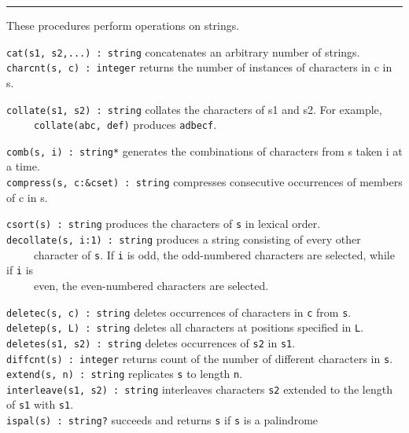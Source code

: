 \vspace{0.25cm}\hrule{}

These procedures perform operations on strings. 

\texttt{cat(s1, s2,...) : string} concatenates an arbitrary number of
strings.\\
\texttt{charcnt(s, c) : integer} returns the number of instances of
characters in c in s.

\texttt{collate(s1, s2) : string} collates the characters
of s1 and s2. For example,\\
 \ \ \ \ \ \texttt{collate({\textquotedbl}abc{\textquotedbl},
{\textquotedbl}def{\textquotedbl})} produces
\texttt{{\textquotedbl}adbecf{\textquotedbl}}.

\texttt{comb(s, i) : string*} generates the combinations of characters from s taken i at a time.\\
\texttt{compress(s, c:\&cset) : string} compresses consecutive
occurrences of members of c in s.

\texttt{csort(s) : string} produces the characters of \texttt{s} in
lexical order.\\
\texttt{decollate(s, i:1) : string} produces a string consisting of
every other\\
 \ \ \ \ \ character of \texttt{s}. If \texttt{i} is odd, the
odd-numbered characters are selected, while if \texttt{i} is\\
 \ \ \ \ \ even, the even-numbered characters are selected.

\texttt{deletec(s, c) : string} deletes occurrences of characters in
\texttt{c} from \texttt{s}.\\
\texttt{deletep(s, L) : string} deletes all characters at positions
specified in \texttt{L}.\\
\texttt{deletes(s1, s2) : string} deletes occurrences of \texttt{s2} in
\texttt{s1}.\\
\texttt{diffcnt(s) : integer} returns count of the number of different
characters in \texttt{s}.\\
\texttt{extend(s, n) : string} replicates \texttt{s} to length
\texttt{n}.\\
\texttt{interleave(s1, s2) : string} interleaves characters \texttt{s2}
extended to the length of \texttt{s1} with \texttt{s1}.\\
\texttt{ispal(s) : string?} succeeds and returns \texttt{s} if
\texttt{s} is a palindrome


